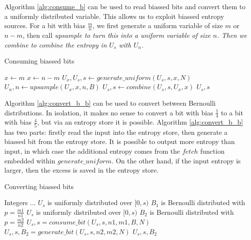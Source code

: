 \documentclass[12pt]{article}
\begin{document}
Algorithm \ref{alg:consume_b} can be used to read biassed bits and convert them to a uniformly distributed variable. This allows us to exploit biassed entropy sources. For a bit with bias $\frac{m}{n}$, we first generate a uniform variable of size $m$ or $n-m$, then call \em upsample \em to turn this into a uniform variable of size $n$. Then we \em combine \em to combine the entropy in $U_s$ with $U_n$.

\begin{algorithm}
\caption{Consuming biassed bits}
\label{alg:consume_b}
\begin{algorithmic}[1]
        \State $x \gets m$
    \Else
        \State $x \gets n-m$
    \EndIf
    \State $U_x, U_s, s \gets generate\_uniform(U_s, s, x, N)$
    \State $U_n, n \gets upsample(U_x, x, n, B)$
    \State $U_s, s \gets combine(U_s, s, U_x, x)$
    \State \Return $U_s, s$
\EndProcedure
\end{algorithmic}
\end{algorithm}

Algorithm \ref{alg:convert_b_b} can be used to convert between Bernoulli distributions. In isolation, it makes no sense to convert a bit with bias $\frac{1}{4}$ to a bit with bias $\frac{4}{5}$, but via an entropy store it is possible. Algorithm \ref{alg:convert_b_b} has two parts: firstly read the input into the entropy store, then generate a biassed bit from the entropy store. It is possible to output more entropy than input, in which case the additional entropy comes from the $fetch$ function embedded within $generate\_uniform$. On the other hand, if the input entropy is larger, then the excess is saved in the entropy store.

\begin{algorithm}
\caption{Converting biassed bits}
\label{alg:convert_b_b}
\begin{algorithmic}[1]
    \Require Integers ...
    \Require $U_s$ is uniformly distributed over $[0,s)$
    \Require $B_1$ is Bernoulli distributed with $p=\frac{m1}{n1}$
    \Ensure $U_s$ is uniformly distributed over $[0,s)$
    \Ensure $B_2$ is Bernoulli distributed with $p=\frac{m2}{n2}$
    \State $U_s, s = consume\_bit(U_s, s, n1, m1, B, N)$
    \State $U_s, s, B_2 = generate\_bit(U_s, s, n2, m2, N)$
    \State \Return $U_s, s, B_2$
\EndProcedure
\end{algorithmic}
\end{algorithm}
\end{document}
